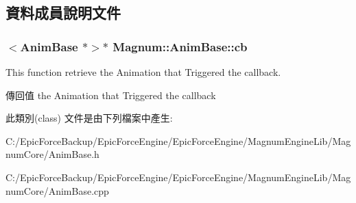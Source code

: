 \subsection{資料成員說明文件}
\subsubsection[{\texorpdfstring{cb}{cb}}]{$<${\bf Anim\+Base} $\ast$$>$$\ast$ Magnum\+::\+Anim\+Base\+::cb\hspace{0.3cm}{\ttfamily [protected]}}\hypertarget{class_magnum_1_1_anim_base_aef3da1af5c5b0877ed67f54b5e8ff726}{}\label{class_magnum_1_1_anim_base_aef3da1af5c5b0877ed67f54b5e8ff726}


This function retrieve the Animation that Triggered the callback. 

\begin{DoxyReturn}{傳回值}
the Animation that Triggered the callback 
\end{DoxyReturn}


此類別(class) 文件是由下列檔案中產生\+:\begin{DoxyCompactItemize}
\item 
C\+:/\+Epic\+Force\+Backup/\+Epic\+Force\+Engine/\+Epic\+Force\+Engine/\+Magnum\+Engine\+Lib/\+Magnum\+Core/Anim\+Base.\+h\item 
C\+:/\+Epic\+Force\+Backup/\+Epic\+Force\+Engine/\+Epic\+Force\+Engine/\+Magnum\+Engine\+Lib/\+Magnum\+Core/Anim\+Base.\+cpp\end{DoxyCompactItemize}
